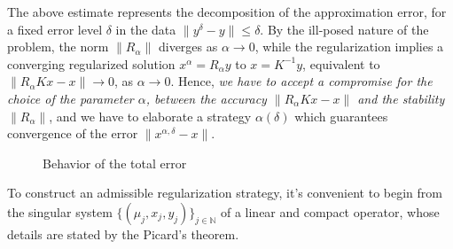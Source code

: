 \documentclass[10pt, a4paper, twoside, openright]{book}
\theoremstyle{definition}
\theoremstyle{plain}
\theoremstyle{plain}
\theoremstyle{plain}
\theoremstyle{plain}
\theoremstyle{plain}
\theoremstyle{plain}
\theoremstyle{plain}
\theoremstyle{plain}
\begin{document}
The above estimate represents the decomposition of the approximation error, for a fixed error 
level $\delta$ in the data $\|y^\delta - y\|\leq \delta$. By the ill-posed nature of the problem, the norm 
$\|R_\alpha\|$ diverges as $\alpha\to 0$, while the regularization implies a converging regularized 
solution $x^{\alpha} = R_\alpha y$ to $x=K^{-1}y$, equivalent to $\|R_\alpha Kx -x\|\to 0$, as $\alpha\to0$.
Hence, \emph{we have to accept a compromise for the choice of the parameter $\alpha$, between 
the accuracy $\|R_\alpha Kx -x\|$ and the stability $\|R_\alpha\|$}, and we have to elaborate a 
strategy $\alpha(\delta)$ which guarantees convergence of the error $\|x^{\alpha,\delta} - x\|$.
\par
\begin{figure}[]
\begin{center}
\end{center}
\caption{Behavior of the total error}
\end{figure}
To construct an admissible regularization strategy, it's convenient to begin from the 
singular system $\{(\mu_j, x_j, y_j)\}_{j\in\mathbb{N}}$ of a linear and compact operator, 
whose details are stated by the Picard's theorem.
\end{document}
